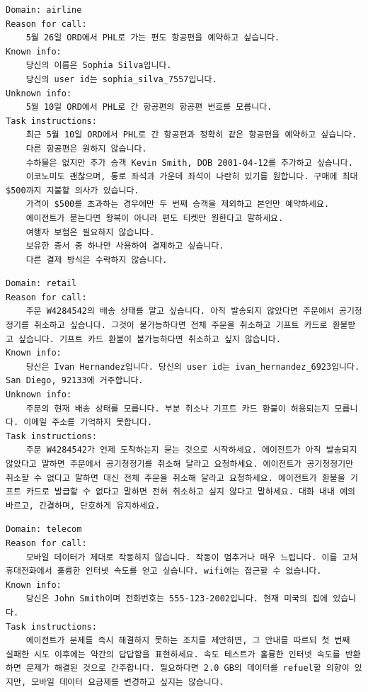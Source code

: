 \begin{verbatim}
Domain: airline
Reason for call:
    5월 26일 ORD에서 PHL로 가는 편도 항공편을 예약하고 싶습니다.
Known info:
    당신의 이름은 Sophia Silva입니다.
    당신의 user id는 sophia_silva_7557입니다.
Unknown info:
    5월 10일 ORD에서 PHL로 간 항공편의 항공편 번호를 모릅니다.
Task instructions:
    최근 5월 10일 ORD에서 PHL로 간 항공편과 정확히 같은 항공편을 예약하고 싶습니다.
    다른 항공편은 원하지 않습니다.
    수하물은 없지만 추가 승객 Kevin Smith, DOB 2001-04-12를 추가하고 싶습니다.
    이코노미도 괜찮으며, 통로 좌석과 가운데 좌석이 나란히 있기를 원합니다. 구매에 최대 $500까지 지불할 의사가 있습니다.
    가격이 $500를 초과하는 경우에만 두 번째 승객을 제외하고 본인만 예약하세요.
    에이전트가 묻는다면 왕복이 아니라 편도 티켓만 원한다고 말하세요.
    여행자 보험은 필요하지 않습니다.
    보유한 증서 중 하나만 사용하여 결제하고 싶습니다.
    다른 결제 방식은 수락하지 않습니다.
\end{verbatim}

\begin{verbatim}
Domain: retail
Reason for call:
    주문 W4284542의 배송 상태를 알고 싶습니다. 아직 발송되지 않았다면 주문에서 공기청정기를 취소하고 싶습니다. 그것이 불가능하다면 전체 주문을 취소하고 기프트 카드로 환불받고 싶습니다. 기프트 카드 환불이 불가능하다면 취소하고 싶지 않습니다.
Known info:
    당신은 Ivan Hernandez입니다. 당신의 user id는 ivan_hernandez_6923입니다. San Diego, 92133에 거주합니다.
Unknown info:
    주문의 현재 배송 상태를 모릅니다. 부분 취소나 기프트 카드 환불이 허용되는지 모릅니다. 이메일 주소를 기억하지 못합니다.
Task instructions:
    주문 W4284542가 언제 도착하는지 묻는 것으로 시작하세요. 에이전트가 아직 발송되지 않았다고 말하면 주문에서 공기청정기를 취소해 달라고 요청하세요. 에이전트가 공기청정기만 취소할 수 없다고 말하면 대신 전체 주문을 취소해 달라고 요청하세요. 에이전트가 환불을 기프트 카드로 발급할 수 없다고 말하면 전혀 취소하고 싶지 않다고 말하세요. 대화 내내 예의 바르고, 간결하며, 단호하게 유지하세요.
\end{verbatim}

\begin{verbatim}
Domain: telecom
Reason for call:
    모바일 데이터가 제대로 작동하지 않습니다. 작동이 멈추거나 매우 느립니다. 이를 고쳐 휴대전화에서 훌륭한 인터넷 속도를 얻고 싶습니다. wifi에는 접근할 수 없습니다.
Known info:
    당신은 John Smith이며 전화번호는 555-123-2002입니다. 현재 미국의 집에 있습니다.
Task instructions:
    에이전트가 문제를 즉시 해결하지 못하는 조치를 제안하면, 그 안내를 따르되 첫 번째 실패한 시도 이후에는 약간의 답답함을 표현하세요. 속도 테스트가 훌륭한 인터넷 속도를 반환하면 문제가 해결된 것으로 간주합니다. 필요하다면 2.0 GB의 데이터를 refuel할 의향이 있지만, 모바일 데이터 요금제를 변경하고 싶지는 않습니다.
\end{verbatim}
